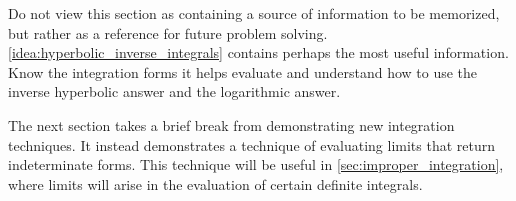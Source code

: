 Do not view this section as containing a source of information to be memorized, but rather as a reference for future problem solving. \autoref{idea:hyperbolic_inverse_integrals} contains perhaps the most useful information. Know the integration forms it helps evaluate and understand how to use the inverse hyperbolic answer and the logarithmic answer.

The next section takes a brief break from demonstrating new integration techniques. It instead demonstrates a technique of evaluating limits that return indeterminate forms. This technique will be useful in \autoref{sec:improper_integration}, where limits will arise in the evaluation of certain definite integrals.


